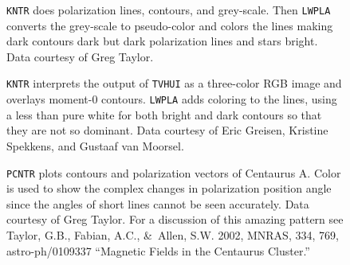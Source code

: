 %
%
\begin{figure}
\centering
\centerline{}
\vspace{12pt}
\centerline{}
\caption[{\tt KNTR} with pseudo-coloring, contours and polarization
vectors in bright and dark lines]{{\tt KNTR} does polarization lines,
contours, and grey-scale.  Then {\tt LWPLA} converts the grey-scale to
pseudo-color and colors the lines making dark contours dark but dark
polarization lines and stars bright.  Data courtesy of Greg Taylor.}
\end{figure}

\begin{figure}
\centering
\centerline{}
\vspace{12pt}
\centerline{}
\caption[{\tt KNTR} shows true-color image]{{\tt KNTR} interprets the
output of {\tt TVHUI} as a three-color RGB image and overlays moment-0
contours. {\tt LWPLA} adds coloring to the lines, using a less than
pure white for both bright and dark contours so that they are not so
dominant. Data courtesy of Eric Greisen, Kristine Spekkens, and
Gustaaf van Moorsel.}
\end{figure}

\begin{figure}
\centering
\centerline{}
\vspace{12pt}
\centerline{}
\caption[{\tt PCNTR} with polarization position angle shown with
color]{{\tt PCNTR} plots contours and polarization vectors of
Centaurus A\@.  Color is used to show the complex changes in
polarization position angle since the angles of short lines cannot be
seen accurately.  Data courtesy of Greg Taylor.  For a discussion of
this amazing pattern see Taylor, G.B., Fabian, A.C., \&\ Allen, S.W.
2002, MNRAS, 334, 769, astro-ph/0109337 ``Magnetic Fields in the
Centaurus Cluster.''}
\end{figure}

